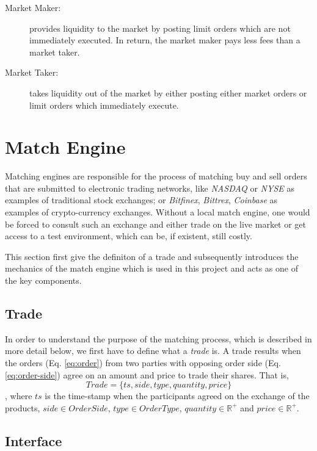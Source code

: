 \begin{description}
    \item[Market Maker:] provides liquidity to the market by posting limit orders which are not immediately executed.
    In return, the market maker pays less fees than a market taker.
    
    \item[Market Taker:] takes liquidity out of the market by either posting either market orders or limit orders which immediately execute.
\end{description}



\section{Match Engine}
\label{sec:match-engine}

Matching engines are responsible for the process of matching buy and sell orders that are submitted to electronic trading networks, like \textit{NASDAQ} or \textit{NYSE} as examples of traditional stock exchanges; or \textit{Bitfinex}, \textit{Bittrex}, \textit{Coinbase} as examples of crypto-currency exchanges.
Without a local match engine, one would be forced to consult such an exchange and either trade on the live market or get access to a test environment, which can be, if existent, still costly.

This section first give the definiton of a trade and subsequently introduces the mechanics of the match engine which is used in this project and acts as one of the key components.

\subsection{Trade}

In order to understand the purpose of the matching process, which is described in more detail below, we first have to define what a \textit{trade} is.
A trade results when the orders (Eq. \ref{eq:order}) from two parties with opposing order side (Eq. \ref{eq:order-side}) agree on an amount and price to trade their shares.
That is,
\begin{equation}\label{eq:trade}
    Trade=\{ ts, side, type, quantity, price \}
\end{equation}
, where $ts$ is the time-stamp when the participants agreed on the exchange of the products, $side \in OrderSide$, $type \in OrderType$, $quantity \in \mathbb{R^+}$ and $price \in \mathbb{R^+}$.

\subsection{Interface}
\label{sec:match-engine-interface}

